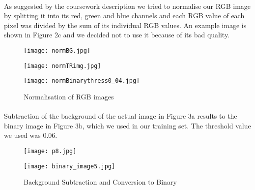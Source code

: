 \documentclass[11pt]{article}
\begin{document}
\paragraph{}
As suggested by the coursework description we tried to normalise our RGB image by splitting it into its red, green and blue channels and each RGB value of each pixel was divided by the sum of its individual RGB values. An example image is shown in Figure 2c and we decided not to use it because of its bad quality.

\begin{figure}[H]
	\begin{minipage}{0.32\textwidth}
		\centering
		\texttt{[image: normBG.jpg]}\\
	\end{minipage}%
	\begin{minipage}{0.32\textwidth}
		\centering
		\texttt{[image: normTRimg.jpg]}\\
	\end{minipage}%
	\begin{minipage}{0.33\textwidth}
		\centering
		\texttt{[image: normBinarythress0\_04.jpg]}\\
	\end{minipage}%
	\centering
	\caption{Normalisation of RGB images}
\end{figure}

\paragraph{}
Subtraction of the background of the actual image in Figure 3a results to the binary image in Figure 3b, which we used in our training set. The threshold value we used was 0.06.

\begin{figure}[H]
	\centering
	\begin{minipage}{0.5\textwidth}
		\centering
		\texttt{[image: p8.jpg]}\\
	\end{minipage}%
	\begin{minipage}{0.5\textwidth}
		\centering
		\texttt{[image: binary\_image5.jpg]}\\
	\end{minipage}%
	\centering
	\caption{Background Subtraction and Conversion to Binary}
\end{figure}
\end{document}
